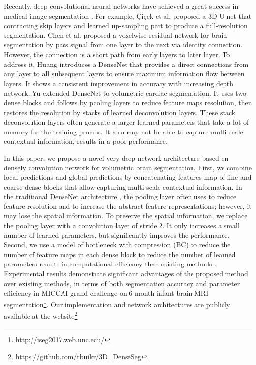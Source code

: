 \documentclass{llncs}
\begin{document}
Recently, deep convolutional neural networks \cite{lecun1998gradient} have achieved a great success in medical image segmentation \cite{zhang2015deep, ronneberger2015u, moeskops2016automatic}. For example, {\c{C}}i{\c{c}}ek et al. \cite{cciccek20163d} proposed a 3D U-net that contracting skip layers and learned up-sampling part to produce a full-resolution segmentation. Chen et al. \cite{chen2017voxresnet} proposed a voxelwise residual network for brain segmentation by pass signal from one layer to the next via identity connection. However, the connection is a short path from early layers to later layer. To address it, Huang \cite{huang2017densely} introduces a DenseNet that provides a direct connections from any layer to all subsequent layers to ensure maximum information flow between layers. It shows a consistent improvement in accuracy with increasing depth network. Yu \cite{yu2017automatic} extended DenseNet to volumetric cardiac segmentation. It uses two dense blocks and follows by pooling layers to reduce feature maps resolution, then restores the resolution by stacks of learned deconvolution layers. These stack deconvolution layers often generate a larger learned parameters that take a lot of memory for the training process. It also may not be able to capture multi-scale contextual information, results in a poor performance. 

In this paper, we propose a novel very deep network architecture based on densely convolution network for volumetric brain segmentation. First, we combine local predictions and global predictions by concatenating features map of fine and coarse dense blocks that allow capturing multi-scale contextual information. In the traditional DenseNet architecture \cite{huang2017densely}, the pooling layer often uses to reduce feature resolution and to increase the abstract feature representations; however, it may lose the spatial information. To preserve the spatial information, we replace the pooling layer with a convolution layer of stride 2. It only increases a small number of learned parameters, but significantly improves the performance.  Second, we use a model of bottleneck with compression (BC) to reduce the number of feature maps in each dense block to reduce the number of learned parameters results in computational efficiency than existing methods \cite{cciccek20163d,yu2017automatic}. Experimental results demonstrate significant advantages of the proposed method over existing methods, in terms of both segmentation accuracy and parameter efficiency in  MICCAI grand challenge on 6-month infant brain MRI segmentation\footnote{http://iseg2017.web.unc.edu/}. Our implementation and network architectures are publicly available at the website\footnote{https://github.com/tbuikr/3D\_DenseSeg}
\end{document}
